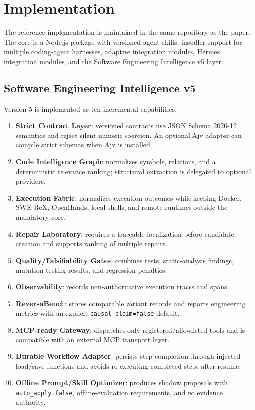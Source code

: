 \section{Implementation}

The reference implementation is maintained in the same repository as the paper. The core is a Node.js package with versioned agent skills, installer support for multiple coding-agent harnesses, adaptive integration modules, Hermes integration modules, and the Software Engineering Intelligence v5 layer.

\subsection{Software Engineering Intelligence v5}

Version 5 is implemented as ten incremental capabilities:

\begin{enumerate}
  \item \textbf{Strict Contract Layer}: versioned contracts use JSON Schema 2020-12 semantics and reject silent numeric coercion. An optional Ajv adapter can compile strict schemas when Ajv is installed.
  \item \textbf{Code Intelligence Graph}: normalizes symbols, relations, and a deterministic relevance ranking; structural extraction is delegated to optional providers.
  \item \textbf{Execution Fabric}: normalizes execution outcomes while keeping Docker, SWE-ReX, OpenHands, local shells, and remote runtimes outside the mandatory core.
  \item \textbf{Repair Laboratory}: requires a traceable localization before candidate creation and supports ranking of multiple repairs.
  \item \textbf{Quality/Falsifiability Gates}: combines tests, static-analysis findings, mutation-testing results, and regression penalties.
  \item \textbf{Observability}: records non-authoritative execution traces and spans.
  \item \textbf{ReversaBench}: stores comparable variant records and reports engineering metrics with an explicit \texttt{causal\_claim=false} default.
  \item \textbf{MCP-ready Gateway}: dispatches only registered/allowlisted tools and is compatible with an external MCP transport layer.
  \item \textbf{Durable Workflow Adapter}: persists step completion through injected load/save functions and avoids re-executing completed steps after resume.
  \item \textbf{Offline Prompt/Skill Optimizer}: produces shadow proposals with \texttt{auto\_apply=false}, offline-evaluation requirements, and no evidence authority.
\end{enumerate}

